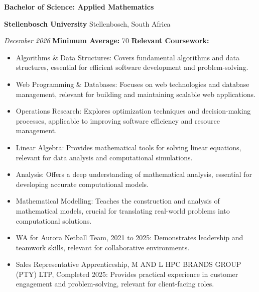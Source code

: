 \documentclass[11pt, a4paper]{article}
\newcommand{\sectionrule}{%
  \vspace{2pt}{\color{BorderClr}\rule{\linewidth}{0.6pt}}\vspace{4pt}%
}
\begin{document}
\vspace{6pt}
\noindent\textcolor{DarkTxt}{\textbf{\large Bachelor of Science: Applied Mathematics}}\par
\vspace{2pt}
\noindent\textcolor{MDGreen}{\textbf{Stellenbosch University}}\;%
\textcolor{LiteTxt}{\bullet\; Stellenbosch, South Africa}\par
\vspace{1pt}
\noindent\textcolor{LiteTxt}{\textit{December 2026}}
\vspace{2pt}
\noindent\textcolor{MidTxt}{\textbf{Minimum Average:}}\;%
\textcolor{DKGreen}{70}
\vspace{3pt}
\noindent\textcolor{DKGreen}{\textbf{Relevant Coursework:}}
\sectionrule
\begin{itemize}
  \item \textcolor{MidTxt}{Algorithms \& Data Structures: Covers fundamental algorithms and data structures, essential for efficient software development and problem-solving.}
  \item \textcolor{MidTxt}{Web Programming \& Databases: Focuses on web technologies and database management, relevant for building and maintaining scalable web applications.}
  \item \textcolor{MidTxt}{Operations Research: Explores optimization techniques and decision-making processes, applicable to improving software efficiency and resource management.}
  \item \textcolor{MidTxt}{Linear Algebra: Provides mathematical tools for solving linear equations, relevant for data analysis and computational simulations.}
  \item \textcolor{MidTxt}{Analysis: Offers a deep understanding of mathematical analysis, essential for developing accurate computational models.}
  \item \textcolor{MidTxt}{Mathematical Modelling: Teaches the construction and analysis of mathematical models, crucial for translating real-world problems into computational solutions.}
  \item \textcolor{MidTxt}{WA for Aurora Netball Team, 2021 to 2025: Demonstrates leadership and teamwork skills, relevant for collaborative environments.}
  \item \textcolor{MidTxt}{Sales Representative Apprenticeship, M AND L HPC BRANDS GROUP (PTY) LTP, Completed 2025: Provides practical experience in customer engagement and problem-solving, relevant for client-facing roles.}
\end{itemize}
\vspace{2pt}
\end{document}

